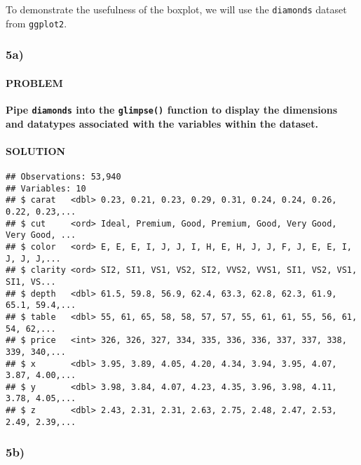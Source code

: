 \documentclass[]{article}
\newenvironment{Shaded}{\begin{snugshade}}{\end{snugshade}}
\newcommand{\KeywordTok}[1]{\textcolor[rgb]{0.13,0.29,0.53}{\textbf{#1}}}
\newcommand{\NormalTok}[1]{#1}
\newcommand{\OperatorTok}[1]{\textcolor[rgb]{0.81,0.36,0.00}{\textbf{#1}}}
\newcommand{\StringTok}[1]{\textcolor[rgb]{0.31,0.60,0.02}{#1}}
\let\oldparagraph\paragraph
\renewcommand{\paragraph}[1]{\oldparagraph{#1}\mbox{}}
\begin{document}
To demonstrate the usefulness of the boxplot, we will use the
\texttt{diamonds} dataset from \texttt{ggplot2}.

\hypertarget{a-4}{%
\subsubsection{5a)}\label{a-4}}

\hypertarget{problem-24}{%
\paragraph{PROBLEM}\label{problem-24}}

\textbf{Pipe \texttt{diamonds} into the \texttt{glimpse()} function to
display the dimensions and datatypes associated with the variables
within the dataset.}

\hypertarget{solution-23}{%
\paragraph{SOLUTION}\label{solution-23}}

\begin{Shaded}
\end{Shaded}

\begin{verbatim}
## Observations: 53,940
## Variables: 10
## $ carat   <dbl> 0.23, 0.21, 0.23, 0.29, 0.31, 0.24, 0.24, 0.26, 0.22, 0.23,...
## $ cut     <ord> Ideal, Premium, Good, Premium, Good, Very Good, Very Good, ...
## $ color   <ord> E, E, E, I, J, J, I, H, E, H, J, J, F, J, E, E, I, J, J, J,...
## $ clarity <ord> SI2, SI1, VS1, VS2, SI2, VVS2, VVS1, SI1, VS2, VS1, SI1, VS...
## $ depth   <dbl> 61.5, 59.8, 56.9, 62.4, 63.3, 62.8, 62.3, 61.9, 65.1, 59.4,...
## $ table   <dbl> 55, 61, 65, 58, 58, 57, 57, 55, 61, 61, 55, 56, 61, 54, 62,...
## $ price   <int> 326, 326, 327, 334, 335, 336, 336, 337, 337, 338, 339, 340,...
## $ x       <dbl> 3.95, 3.89, 4.05, 4.20, 4.34, 3.94, 3.95, 4.07, 3.87, 4.00,...
## $ y       <dbl> 3.98, 3.84, 4.07, 4.23, 4.35, 3.96, 3.98, 4.11, 3.78, 4.05,...
## $ z       <dbl> 2.43, 2.31, 2.31, 2.63, 2.75, 2.48, 2.47, 2.53, 2.49, 2.39,...
\end{verbatim}

\hypertarget{b-4}{%
\subsubsection{5b)}\label{b-4}}
\end{document}
